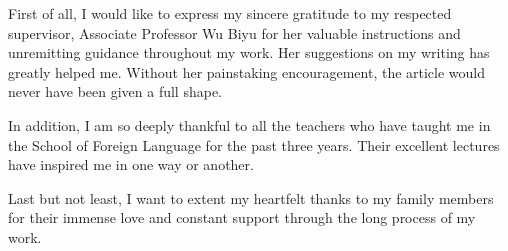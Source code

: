 \acknowledgment
\begin{text}

First of all, I would like to express my sincere gratitude to my respected supervisor, Associate Professor Wu Biyu for her valuable instructions and unremitting guidance throughout my work. Her suggestions on my writing has greatly helped me. Without her painstaking encouragement, the article would never have been given a full shape.

In addition, I am so deeply thankful to all the teachers who have taught me in the School of Foreign Language for the past three years. Their excellent lectures have inspired me in one way or another.

Last but not least, I want to extent my heartfelt thanks to my family members for their immense love and constant support through the long process of my work.

\end{text}

